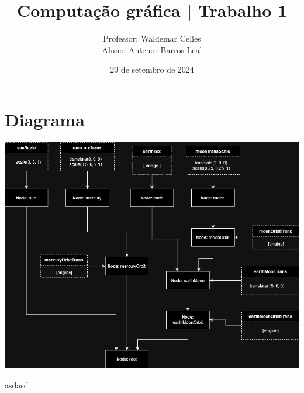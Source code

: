 \documentclass[11pt, a4paper]{article}
\title{Computação gráfica | Trabalho 1}
\author{Professor: Waldemar Celles\\
Aluno: Antenor Barros Leal}
\date{29 de setembro de 2024}
\begin{document}
\maketitle

\section{Diagrama}
\includegraphics[width=0.8\linewidth]{Trab1Graph.png}

asdasd
\end{document}
